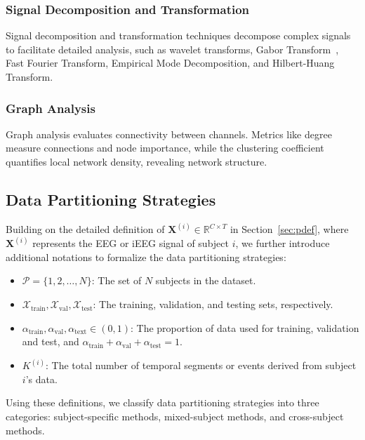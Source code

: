 \subsubsection{Signal Decomposition and Transformation}
Signal decomposition and transformation techniques decompose complex signals to facilitate detailed analysis, such as wavelet transforms, Gabor Transform~\cite{PD2}, Fast Fourier Transform, Empirical Mode Decomposition, and Hilbert-Huang Transform.

\subsubsection{Graph Analysis}
Graph analysis evaluates connectivity between channels. Metrics like degree measure connections and node importance, while the clustering coefficient quantifies local network density, revealing network structure.


\subsection{Data Partitioning Strategies}

Building on the detailed definition of \(\mathbf{X}^{(i)} \in \mathbb{R}^{C \times T}\) in Section~\ref{sec:pdef}, where \(\mathbf{X}^{(i)}\) represents the EEG or iEEG signal of subject \(i\), we further introduce additional notations to formalize the data partitioning strategies:

\begin{itemize}
    \item \(\mathcal{P} = \{1, 2, \dots, N\}\): The set of \(N\) subjects in the dataset.
    \item \(\mathcal{X}_\text{train}, \mathcal{X}_\text{val}, \mathcal{X}_\text{test}\): The training, validation, and testing sets, respectively.
    \item \(\alpha_\text{train}, \alpha_\text{val}, \alpha_\text{text}  \in (0, 1)\): The proportion of data used for training, validation and test, and \(\alpha_\text{train} + \alpha_\text{val} + \alpha_\text{test} = 1.\)
    \item \(K^{(i)}\): The total number of temporal segments or events derived from subject \(i\)'s data.
\end{itemize}

Using these definitions, we classify data partitioning strategies into three categories: subject-specific methods, mixed-subject methods, and cross-subject methods.

